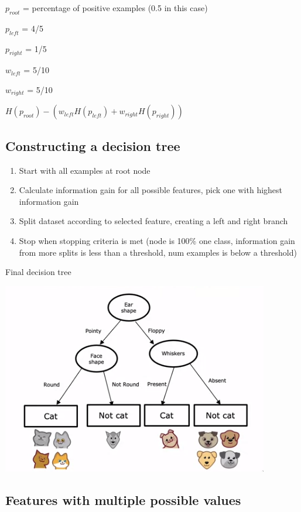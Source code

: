 \documentclass[12pt]{article}
\begin{document}
$p_{root}$ = percentage of positive examples (0.5 in this case)

$p_{left}$ = 4/5

$p_{right}$ = 1/5

$w_{left}$ = 5/10

$w_{right}$ = 5/10

$H(p_{root}) - (w_{left} H(p_{left}) + w_{right} H(p_{right}))$

\subsection{Constructing a decision tree}

\begin{enumerate}
    \item Start with all examples at root node
    \item Calculate information gain for all possible features, pick one with highest information gain
    \item Split dataset according to selected feature, creating a left and right branch
    \item Stop when stopping criteria is met (node is 100\% one class, information gain
        from more splits is less than a threshold, num examples is below a threshold)
\end{enumerate}

Final decision tree

\includegraphics[scale=.5]{decision-tree}

\subsection{Features with multiple possible values}
\end{document}
